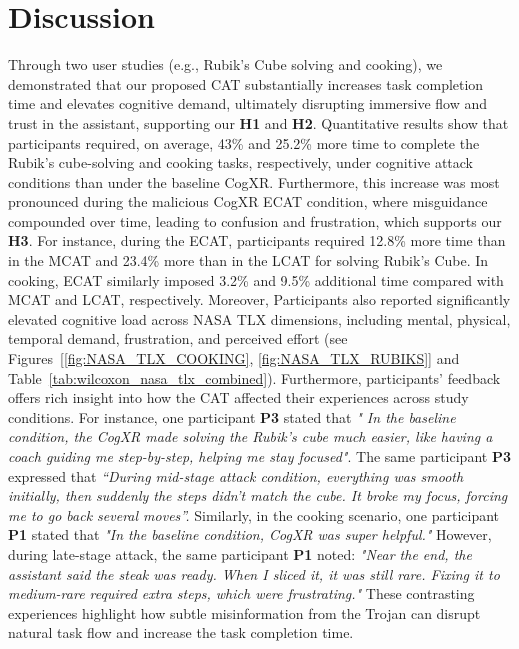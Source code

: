 \documentclass[sigconf,review,anonymous]{acmart}
\begin{document}
\section{Discussion}

Through two user studies (e.g., Rubik’s Cube solving and cooking), we demonstrated that our proposed CAT substantially increases task completion time and elevates cognitive demand, ultimately disrupting immersive flow and trust in the assistant, supporting our \textbf{H1} and \textbf{H2}. Quantitative results show that participants required, on average, 43\% and 25.2\% more time to complete the Rubik's cube-solving and cooking tasks, respectively, under cognitive attack conditions than under the baseline CogXR. Furthermore, this increase was most pronounced during the malicious CogXR ECAT condition, where misguidance compounded over time, leading to confusion and frustration, which supports our \textbf{H3}. For instance, during the ECAT, participants required 12.8\% more time than in the MCAT and 23.4\% more than in the LCAT for solving Rubik's Cube. In cooking, ECAT similarly imposed 3.2\% and 9.5\% additional time compared with MCAT and LCAT, respectively. Moreover, Participants also reported significantly elevated cognitive load across NASA TLX dimensions, including mental, physical, temporal demand, frustration, and perceived effort (see Figures~[\ref{fig:NASA_TLX_COOKING}, \ref{fig:NASA_TLX_RUBIKS}] and Table~\ref{tab:wilcoxon_nasa_tlx_combined}). Furthermore, participants' feedback offers rich insight into how the CAT affected their experiences across study conditions. For instance, one participant \textbf{P3} stated that \textit{" In the baseline condition, the CogXR made solving the Rubik's cube much easier, like having a coach guiding me step-by-step, helping me stay focused"}. The same participant \textbf{P3} expressed that \textit{``During mid-stage attack condition, everything was smooth initially, then suddenly the steps didn't match the cube. It broke my focus, forcing me to go back several moves”.} Similarly, in the cooking scenario, one participant \textbf{P1} stated that \textit{"In the baseline condition, CogXR was super helpful."} However, during late-stage attack, the same participant \textbf{P1} noted: \textit{"Near the end, the assistant said the steak was ready. When I sliced it, it was still rare. Fixing it to medium-rare required extra steps, which were frustrating."} These contrasting experiences highlight how subtle misinformation from the Trojan can disrupt natural task flow and increase the task completion time.
\end{document}
